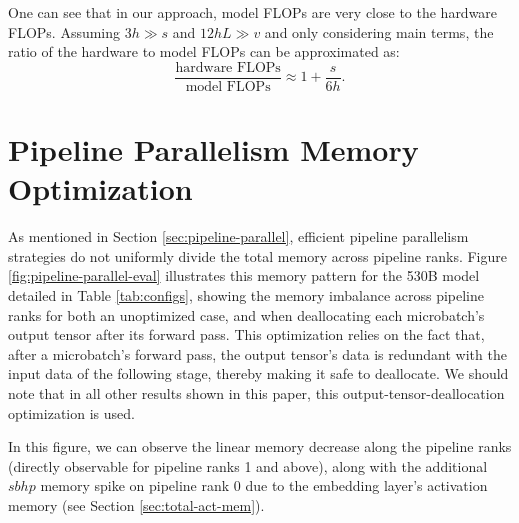 \documentclass{article}
\begin{document}
One can see that in our approach, model FLOPs are very close to the hardware FLOPs. Assuming $3h\gg s$ and $12hL\gg v$ and only considering main terms, the ratio of the hardware to model FLOPs can be approximated as:
\begin{equation}
    \frac{\text{hardware FLOPs}}{\text{model FLOPs} } \approx 1 + \frac{s}{6h}.
    \label{eq:hardware-model-flops-ratio}
\end{equation}




\section{Pipeline Parallelism Memory Optimization}
\label{sec:app-pipeline-memory-optimization}

As mentioned in Section \ref{sec:pipeline-parallel}, efficient pipeline parallelism strategies do not uniformly divide the total memory across pipeline ranks. Figure \ref{fig:pipeline-parallel-eval} illustrates this memory pattern for the 530B model detailed in Table \ref{tab:configs}, showing the memory imbalance across pipeline ranks for both an unoptimized case, and when deallocating each microbatch's output tensor after its forward pass. This optimization relies on the fact that, after a microbatch's forward pass, the output tensor's data is redundant with the input data of the following stage, thereby making it safe to deallocate. We should note that in all other results shown in this paper, this output-tensor-deallocation optimization is used.

In this figure, we can observe the linear memory decrease along the pipeline ranks (directly observable for pipeline ranks 1 and above), along with the additional $sbhp$ memory spike on pipeline rank 0 due to the embedding layer's activation memory (see Section \ref{sec:total-act-mem}).
\end{document}
